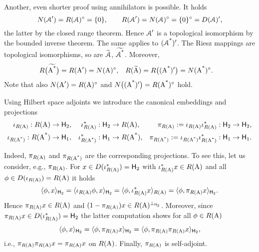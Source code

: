 \documentclass[a4paper]{amsart}
\renewcommand{\H}{\mathsf{H}}
\begin{document}
\begin{rem}
Another, even shorter proof using annihilators is possible. It holds
$$N(\operatorname{\mathcal{A}}')=R(\operatorname{\mathcal{A}})^{\circ}=\{0\},\qquad
R(\operatorname{\mathcal{A}}')=N(\operatorname{\mathcal{A}})^{\circ}=\{0\}^{\circ}=D(\operatorname{\mathcal{A}})',$$
the latter by the closed range theorem.
Hence $\operatorname{\mathcal{A}}'$ is a topological isomorphism by the bounded inverse theorem.
The same applies to $(\operatorname{\operatorname{\mathcal{A}}^{*}})'$.
The Riesz mappings are topological isomorphisms,
so are $\widetilde{\operatorname{\mathcal{A}}}$, $\widetilde{\operatorname{\operatorname{\mathcal{A}}^{*}}}$. Moreover,
\begin{align*}
R\big(\widetilde{\operatorname{\operatorname{A}^{*}}}\big)=R(\operatorname{A}')&=N(\operatorname{A})^{\circ},
&
R(\widetilde{\operatorname{A}})=R\big((\operatorname{\operatorname{A}^{*}})'\big)&=N(\operatorname{\operatorname{A}^{*}})^{\circ}.
\end{align*}
Note that also $N(\operatorname{A}')=R(\operatorname{A})^{\circ}$ and $N\big((\operatorname{\operatorname{A}^{*}})'\big)=R(\operatorname{\operatorname{A}^{*}})^{\circ}$ hold.
\end{rem}

Using Hilbert space adjoints we introduce the canonical embeddings and projections 
\begin{align*}
\iota_{R(\A)}:R(\A)&\to\H_{2},
&
\iota_{R(\A)}^{*}:\H_{2}&\to R(\A),
&
\pi_{R(\A)}:=\iota_{R(\A)}\iota_{R(\A)}^{*}:\H_{2}&\to\H_{2},\\
\iota_{R(\As)}:R(\As)&\to\H_{1},
&
\iota_{R(\As)}^{*}:\H_{1}&\to R(\As),
&
\pi_{R(\As)}:=\iota_{R(\As)}\iota_{R(\As)}^{*}:\H_{1}&\to\H_{1}.
\end{align*}

\begin{rem}
Indeed, $\pi_{R(\operatorname{A})}$ and $\pi_{R(\operatorname{\operatorname{A}^{*}})}$ are the corresponding projections.
To see this, let us consider, e.g., $\pi_{R(\operatorname{A})}$.
For $x\in D(\iota_{R(\A)}^{*})=\H_{2}$ with $\iota_{R(\operatorname{A})}^{*}x\in R(\operatorname{A})$ 
and all $\phi\in D(\iota_{R(\operatorname{A})})=R(\operatorname{A})$ it holds
$$\scp{\phi}{x}_{\H_{2}}
=\scp{\iota_{R(\A)}\phi}{x}_{\H_{2}}
=\scp{\phi}{\iota_{R(\A)}^{*}x}_{R(\A)}
=\scp{\phi}{\pi_{R(\A)}x}_{\H_{2}}.$$
Hence $\pi_{R(\operatorname{A})}x\in R(\operatorname{A})$ and $(1-\pi_{R(\A)})x\in R(\A)^{\bot_{\H_{2}}}$.
Moreover, since $\pi_{R(\A)}x\in D(\iota_{R(\A)}^{*})=\H_{2}$ the latter computation shows
for all $\phi\in R(\operatorname{A})$
$$\scp{\phi}{x}_{\H_{2}}
=\scp{\phi}{\pi_{R(\A)}x}_{\H_{2}}
=\scp{\phi}{\pi_{R(\A)}\pi_{R(\A)}x}_{\H_{2}},$$
i.e., $\pi_{R(\operatorname{A})}\pi_{R(\operatorname{A})}x=\pi_{R(\operatorname{A})}x$ on $R(\operatorname{A})$.
Finally, $\pi_{R(\operatorname{A})}$ is self-adjoint.
\end{rem}
\end{document}
